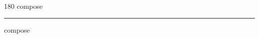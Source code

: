
\begin{frame}
\begin{center}
\begin{turn}{180}
{\fontsize{2.5cm}{1em}\selectfont compose}
\end{turn}
\vspace{1em}\par  
\hrule
\vspace{1em}\par  
{\fontsize{2.5cm}{1em}\selectfont compose}
\end{center}
\end{frame}
